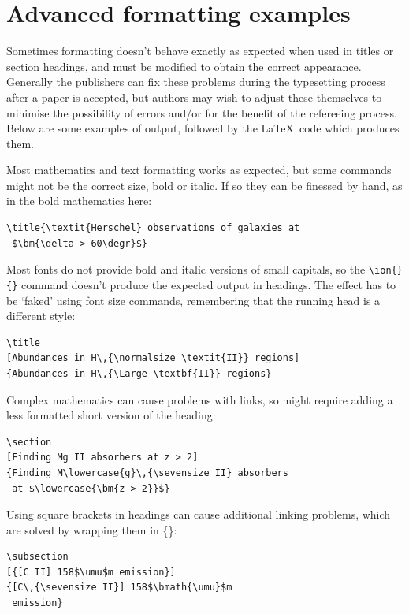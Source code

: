 \documentclass[fleqn,usenatbib,useAMS]{mnras}
\begin{document}
\clearpage %
\section{Advanced formatting examples}
\label{sec:advanced}

Sometimes formatting doesn't behave exactly as expected when used in titles or section headings, and must be modified to obtain the correct appearance.
Generally the publishers can fix these problems during the typesetting process after a paper is accepted, but authors may wish to adjust these themselves to minimise the possibility of errors and/or for the benefit of the refereeing process.
Below are some examples of output, followed by the \LaTeX\ code which produces them.

Most mathematics and text formatting works as expected, but some commands might not be the correct size, bold or italic.
If so they can be finessed by hand, as in the bold mathematics here:
\begin{verbatim}
\title{\textit{Herschel} observations of galaxies at
 $\bm{\delta > 60\degr}$}
\end{verbatim}

Most fonts do not provide bold and italic versions of small capitals, so the \verb'\ion{}{}' command doesn't produce the expected output in headings.
The effect has to be `faked' using font size commands, remembering that the running head is a different style:
\begin{verbatim}
\title
[Abundances in H\,{\normalsize \textit{II}} regions]
{Abundances in H\,{\Large \textbf{II}} regions}
\end{verbatim}

Complex mathematics can cause problems with links, so might require adding a less formatted short version of the heading:
\begin{verbatim}
\section
[Finding Mg II absorbers at z > 2]
{Finding M\lowercase{g}\,{\sevensize II} absorbers
 at $\lowercase{\bm{z > 2}}$}
\end{verbatim}


Using square brackets in headings can cause additional linking problems, which are solved by wrapping them in \{\textellipsis\}:
\begin{verbatim}
\subsection
[{[C II] 158$\umu$m emission}]
{[C\,{\sevensize II}] 158$\bmath{\umu}$m
 emission}
\end{verbatim}
\end{document}

